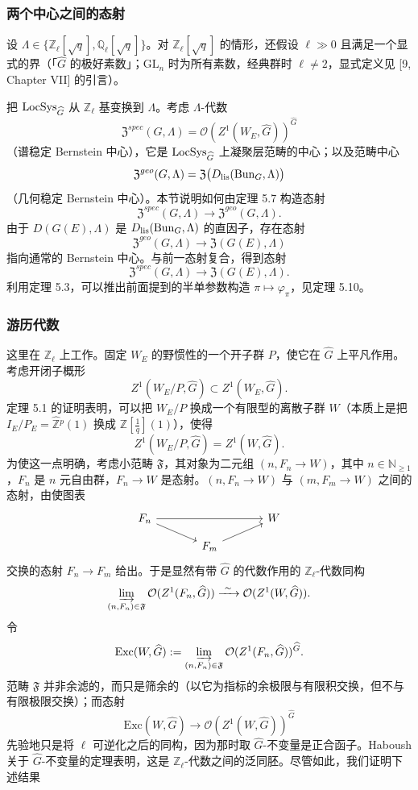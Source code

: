 \subsubsection{两个中心之间的态射}
设 $\Lambda\in\{\mathbb{Z}_{\ell}[\sqrt{q}],\mathbb{Q}_{\ell}[\sqrt{q}]\}$。对 $\mathbb{Z}_{\ell}[\sqrt{q}]$ 的情形，还假设 $\ell\gg0$ 且满足一个显式的界（「$\widehat{G}$ 的极好素数」；$\mathrm{GL}_{n}$ 时为所有素数，经典群时 $\ell\ne2$，显式定义见 [9, Chapter VII] 的引言）。

把 $\operatorname{LocSys}_{\widehat{G}}$ 从 $\mathbb{Z}_{\ell}$ 基变换到 $\Lambda$。考虑 $\Lambda$-代数
\[
\mathfrak{Z}^{spec}(G,\Lambda)=\mathcal{O}(Z^{1}(W_{E},\widehat{G}))^{\widehat{G}}
\]
（谱稳定 Bernstein 中心），它是 $\operatorname{LocSys}_{\widehat{G}}$ 上凝聚层范畴的中心；以及范畴中心
\[
\mathfrak{Z}^{geo}(G,\Lambda)=\mathfrak{Z}\bigl(D_{\mathrm{lis}}(\operatorname{Bun}_{G},\Lambda)\bigr)
\]
（几何稳定 Bernstein 中心）。本节说明如何由定理 5.7 构造态射
\[
\mathfrak{Z}^{spec}(G,\Lambda)\longrightarrow\mathfrak{Z}^{geo}(G,\Lambda).
\]
由于 $D(G(E),\Lambda)$ 是 $D_{\mathrm{lis}}(\operatorname{Bun}_{G},\Lambda)$ 的直因子，存在态射
\[
\mathfrak{Z}^{geo}(G,\Lambda)\longrightarrow\mathfrak{Z}(G(E),\Lambda)
\]
指向通常的 Bernstein 中心。与前一态射复合，得到态射
\[
\mathfrak{Z}^{spec}(G,\Lambda)\longrightarrow\mathfrak{Z}(G(E),\Lambda).
\]
利用定理 5.3，可以推出前面提到的半单参数构造 $\pi\mapsto\varphi_{\pi}$，见定理 5.10。

\subsubsection{游历代数}
这里在 $\mathbb{Z}_{\ell}$ 上工作。固定 $W_{E}$ 的野惯性的一个开子群 $P$，使它在 $\widehat{G}$ 上平凡作用。考虑开闭子概形
\[
Z^{1}(W_{E}/P,\widehat{G})\subset Z^{1}(W_{E},\widehat{G}).
\]
定理 5.1 的证明表明，可以把 $W_{E}/P$ 换成一个有限型的离散子群 $W$（本质上是把 $I_{E}/P_{E}=\widehat{\mathbb{Z}}{}^{p}(1)$ 换成 $\mathbb{Z}[\tfrac{1}{q}](1)$），使得
\[
Z^{1}(W_{E}/P,\widehat{G})=Z^{1}(W,\widehat{G}).
\]
为使这一点明确，考虑小范畴 $\mathfrak{F}$，其对象为二元组 $(n,F_{n}\to W)$，其中 $n\in\mathbb{N}_{\ge1}$，$F_{n}$ 是 $n$ 元自由群，$F_{n}\to W$ 是态射。$(n,F_{n}\to W)$ 与 $(m,F_{m}\to W)$ 之间的态射，由使图表
\[
\begin{tikzcd}[column sep=large,row sep=small]
F_{n} \arrow[rr] \arrow[dr] & & W \\
& F_{m} \arrow[ur] &
\end{tikzcd}
\]
交换的态射 $F_{n}\to F_{m}$ 给出。于是显然有带 $\widehat{G}$ 的代数作用的 $\mathbb{Z}_{\ell}$-代数同构
\[
\varinjlim_{(n,F_{n})\in\mathfrak{F}}\mathcal{O}(Z^{1}(F_{n},\widehat{G}))\xrightarrow{\ \sim\ }\mathcal{O}(Z^{1}(W,\widehat{G})).
\]
令
\[
\mathrm{Exc}(W,\widehat{G}):=\varinjlim_{(n,F_{n})\in\mathfrak{F}}\mathcal{O}(Z^{1}(F_{n},\widehat{G}))^{\widehat{G}}.
\]
范畴 $\mathfrak{F}$ 并非余滤的，而只是筛余的（以它为指标的余极限与有限积交换，但不与有限极限交换）；而态射
\[
\mathrm{Exc}(W,\widehat{G})\longrightarrow\mathcal{O}(Z^{1}(W,\widehat{G}))^{\widehat{G}}
\]
先验地只是将 $\ell$ 可逆化之后的同构，因为那时取 $\widehat{G}$-不变量是正合函子。Haboush 关于 $\widehat{G}$-不变量的定理表明，这是 $\mathbb{Z}_{\ell}$-代数之间的泛同胚。尽管如此，我们证明下述结果

